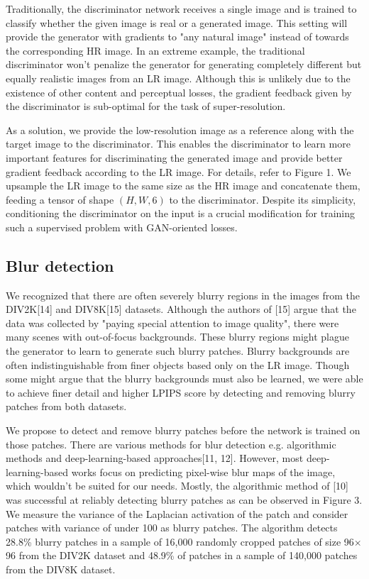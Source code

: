 \documentclass{article}
\begin{document}
Traditionally, the discriminator network receives a single image and is trained to classify whether the given image is real or a generated image. This setting will provide the generator with gradients to "any natural image" instead of towards the corresponding HR image. In an extreme example, the traditional discriminator won't penalize the generator for generating completely different but equally realistic images from an LR image. Although this is unlikely due to the existence of other content and perceptual losses, the gradient feedback given by the discriminator is sub-optimal for the task of super-resolution. 

As a solution, we provide the low-resolution image as a reference along with the target image to the discriminator. This enables the discriminator to learn more important features for discriminating the generated image and provide better gradient feedback according to the LR image. For details, refer to Figure 1. We upsample the LR image to the same size as the HR image and concatenate them, feeding a tensor of shape $(H, W, 6)$ to the discriminator. Despite its simplicity, conditioning the discriminator on the input is a crucial modification for training such a supervised problem with GAN-oriented losses.

\subsection{Blur detection}

We recognized that there are often severely blurry regions in the images from the DIV2K[14] and DIV8K[15] datasets. Although the authors of [15] argue that the data was collected by "paying special attention to image quality", there were many scenes with out-of-focus backgrounds. These blurry regions might plague the generator to learn to generate such blurry patches. Blurry backgrounds are often indistinguishable from finer objects based only on the LR image. Though some might argue that the blurry backgrounds must also be learned, we were able to achieve finer detail and higher LPIPS score by detecting and removing blurry patches from both datasets. 

We propose to detect and remove blurry patches before the network is trained on those patches. There are various methods for blur detection e.g. algorithmic methods and deep-learning-based approaches[11, 12]. However, most deep-learning-based works focus on predicting pixel-wise blur maps of the image, which wouldn't be suited for our needs. Mostly, the algorithmic method of [10] was successful at reliably detecting blurry patches as can be observed in Figure 3. We measure the variance of the Laplacian activation of the patch and consider patches with variance of under 100 as blurry patches. The algorithm detects 28.8\% blurry patches in a sample of 16,000 randomly cropped patches of size 96$\times$96 from the DIV2K dataset and 48.9\% of patches in a sample of 140,000 patches from the DIV8K dataset.
\end{document}
